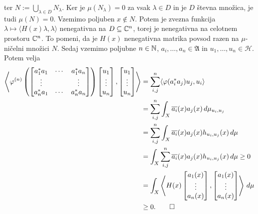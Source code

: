 \begin{dokaz}
            ter $N := \bigcup_{\lambda \in D} N_\lambda$.
            Ker je $\mu(N_\lambda) = 0$ za vsak $\lambda \in D$ in je $D$ števna množica, je tudi $\mu(N) = 0$.
            Vzemimo poljuben $x \notin N$.
            Potem je zvezna funkcija $\lambda \mapsto \langle H(x) \lambda, \lambda \rangle$ nenegativna na $D \subseteq \mathbb C^n$, torej je nenegativna na celotnem
            prostoru $\mathbb C^n$. To pomeni, da je $H(x)$ nenegativna matrika povsod razen na $\mu$-ničelni množici $N$.
            Sedaj vzemimo poljubne $n \in \mathbb N$, $a_i, \dots, a_n \in \mathfrak{A}$ in $u_1, \dots, u_n \in \mathcal{H}$.
            Potem velja
            \begin{align*}
                \left\langle \varphi^{(n)} \left(\begin{bmatrix}
                    a_1^* a_1  & \cdots & a_1 ^* a_n\\
                    \vdots & & \vdots \\
                    a_n ^* a_1  & \cdots & a_n ^* a_n\\
                \end{bmatrix}\right) \begin{bmatrix}
                    u_1 \\ \vdots \\ u_n
                \end{bmatrix}, 
                \begin{bmatrix}
                    u_1 \\ \vdots \\ u_n
                \end{bmatrix}
                \right\rangle &= \sum_{i, j} ^n \langle \varphi (a_i ^* a_j) u_j, u_i \rangle \\
                &= \sum_{i, j} ^n \int_X \overline{a_i} (x) a_j (x)\, d\mu_{u_i, u_j}\\
                &= \sum_{i, j} ^n \int_X \overline{a_i} (x) a_j (x) h_{u_i, u_j}(x)\, d\mu\\
                &= \int_X \sum_{i, j} ^n \overline{a_i} (x) a_j (x) h_{u_i, u_j}(x)\, d\mu \geq 0\\ 
                &= \int_X \left\langle H(x) \begin{bmatrix}
                    a_1 (x) \\ \vdots \\ a_n (x)
                \end{bmatrix}, \begin{bmatrix}
                    a_1 (x) \\ \vdots \\ a_n (x)
                \end{bmatrix} \right\rangle\, d\mu\\ 
                &\geq 0.  \qedhere
            \end{align*}
\end{dokaz}

